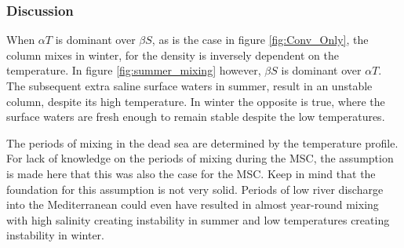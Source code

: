 \documentclass[twocolumn]{article}
\begin{document}
\subsubsection{Discussion}
\label{sect:Summer_mixing_discussion}
When $\alpha T$ is dominant over $\beta S$, as is the case in figure \ref{fig:Conv_Only}, the column mixes in winter, for the density is inversely dependent on
the temperature. In figure \ref{fig:summer_mixing} however, $\beta S$ is dominant over $\alpha T$. The subsequent extra saline surface waters in summer, result in an unstable column, despite its high temperature. In winter the opposite is true, where the surface waters are fresh enough to remain stable despite the low temperatures.

The periods of mixing in the dead sea are determined by the temperature profile. For lack of knowledge on the periods of mixing during the MSC, the assumption is made here that this was also the case for the MSC. Keep in mind that the foundation for this assumption is not very solid. Periods of low river discharge into the Mediterranean could even have resulted in almost year-round mixing with high salinity creating instability in summer and low temperatures creating instability in winter. 
\end{document}
